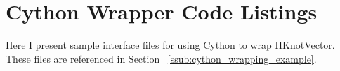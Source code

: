 \section{Cython Wrapper Code Listings} \label{app:cython}

Here I present sample interface files for using Cython to wrap HKnotVector.  These files are referenced in Section ~\ref{ssub:cython_wrapping_example}.

  \mainstretch{}
